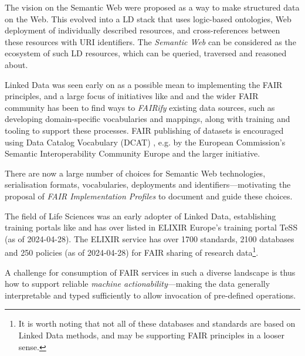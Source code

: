 The vision on the Semantic Web \cite{Berners-Lee 1999} were proposed as a way to make structured data on the Web. This evolved into a \acrfull{LD} stack that uses logic-based ontologies, Web deployment of individually described resources, and cross-references between these resources with \acrfull{URI} identifiers. The \emph{Semantic Web} can be considered as the ecosystem of such \acrlong{LD} resources, which can be queried, traversed and reasoned about. 

Linked Data was seen early on as a possible mean to implementing the FAIR principles, and a large focus of initiatives like  and  and the wider FAIR community has been to find ways to \emph{FAIRify} existing data sources, such as developing domain-specific vocabularies and mappings, along with training and tooling to support these processes. FAIR publishing of datasets is encouraged using Data Catalog Vocabulary (DCAT) \cite{Albertoni 2023}, e.g. by the European Commission's Semantic Interoperability Community Europe  and the larger  initiative.

There are now a large number of choices for Semantic Web technologies, serialisation formats, vocabularies, deployments and identifiers---motivating the proposal of \emph{FAIR Implementation Profiles} \cite{Schultes 2020} to document and guide these choices. 

The field of Life Sciences was an early adopter of Linked Data, establishing training portals like  \cite{Rocca-Serra 2023} and has over  listed in ELIXIR Europe's training portal TeSS (as of 2024-04-28).
The ELIXIR service  \cite{Sansone 2019} has over 1700 standards, 2100 databases and 250 policies (as of 2024-04-28) for FAIR sharing of research data\footnote{It is worth noting that not all of these databases and standards are based on Linked Data methods, and may be supporting FAIR principles in a looser sense.}. 

A challenge for consumption of FAIR services in such a diverse landscape is thus how to support reliable \emph{machine actionability}---making the data generally interpretable and typed sufficiently to allow invocation of pre-defined operations.


